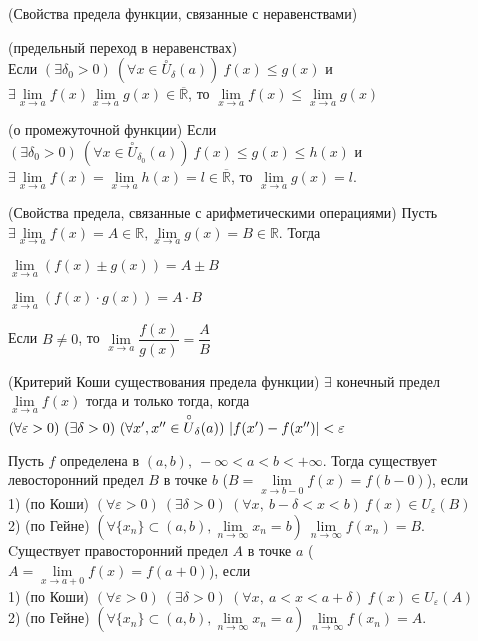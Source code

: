 \begin{multicols}{2}
\begin{theorema}{(Свойства предела функции, связанные с неравенствами)}{}
\begin{enumerate*}
		\item (предельный переход в неравенствах) \\Если $(\exists \delta_0 > 0)\ (\forall x \in\overset{\circ}{U}_\delta(a))\ f(x) \leq g(x)$ и $\exists \lim\limits_{x\to a}f(x)\lim\limits_{x\to a}g(x) \in\overline{\mathbb R}$, то $\lim\limits_{x\to a}f(x) \leq \lim\limits_{x\to a}g(x)$
		\item (о промежуточной функции) Если $(\exists \delta_0 > 0)\ (\forall x \in\overset{\circ}{U}_{\delta_0}(a))\ f(x)\leq g(x)\leq h(x)$ и $\exists \lim\limits_{x\to a}f(x) = \lim\limits_{x\to a}h(x)= l \in\overline{\mathbb R}$, то $\lim\limits_{x\to a}g(x) = l.$
    \end{enumerate*}
\end{theorema}
\begin{theorema}{(Свойства предела, связанные с арифметическими операциями)}{}
    Пусть $\exists \lim\limits_{x\to a}f(x) = A \in\mathbb R, \lim\limits_{x\to a}g(x) = B \in\mathbb R$. Тогда \begin{enumerate*}
		\item $\lim\limits_{x\to a}(f(x)\pm g(x)) = A\pm B$
		\item $\lim\limits_{x\to a}(f(x)\cdot g(x)) = A\cdot B$
		\item Если $B\neq 0$, то $\lim\limits_{x\to a}\dfrac{f(x)}{g(x)} = \dfrac{A}{B}$
\end{enumerate*}
\end{theorema}
\begin{theorema}{(Критерий Коши существования предела функции)}{}
    $\exists$ конечный предел $\lim\limits_{x\to a}f(x)$ тогда и только тогда, когда \\$(\forall \varepsilon > 0)\ (\exists \delta> 0)\ (\forall x', x'' \in \overset{\circ}{U}_\delta(a))\ |f(x') - f(x'')| < \varepsilon$
\end{theorema}
\begin{definition}{}{}
    Пусть $f$ определена в $(a,b),\ -\infty < a < b < +\infty$. Тогда существует левосторонний предел $B$ в точке $b$ ($B = \lim\limits_{x\to b-0} f(x) = f(b-0)$), если\\1) (по Коши) $(\forall \varepsilon > 0)\ (\exists \delta > 0)\ (\forall x,\ b-\delta < x < b)\ f(x) \in U_\varepsilon(B)$\\2) (по Гейне) $(\forall \{x_n\}\subset (a,b), \lim\limits_{n\to\infty} x_n = b)\ \lim\limits_{n\to\infty}f(x_n) = B$.
\\Cуществует правосторонний предел $A$ в точке $a$ ($A = \lim\limits_{x\to a+0} f(x) = f(a+0)$), если \\1) (по Коши) $(\forall \varepsilon > 0)\ (\exists \delta > 0)\ (\forall x,\ a < x < a + \delta)\ f(x) \in U_\varepsilon(A)$\\2) (по Гейне) $(\forall \{x_n\}\subset (a,b), \lim\limits_{n\to\infty} x_n = a)\ \lim\limits_{n\to\infty}f(x_n) = A$.

\end{definition}
\end{multicols}
